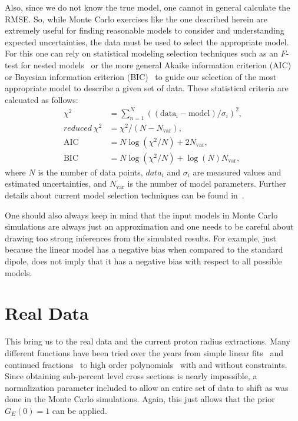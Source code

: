 \documentclass[10pt,aps,prc,twocolumn]{revtex4-1}
\begin{document}
Also, since we do not know the true model, one cannot in general calculate the RMSE. So, while Monte Carlo exercises 
like the one described herein are extremely useful for finding reasonable models to consider and understanding
expected uncertainties, the data must be used to select the appropriate model. 
For this one can rely on statistical modeling selection techniques such as an $F$-test for
nested models~\cite{Bevington:2003,James:2006,Sirca:2016} or the more general Akaike information criterion (AIC)~\cite{Akaike:1974} 
or Bayesian information criterion (BIC)~\cite{Schwarz:1978} 
to guide our selection of the most appropriate model to describe a given set of data.
These statistical criteria are calcuated as follows: 
\begin{align}
\chi^2         & = \sum_{n=1}^{N}((\mathrm{data_i} - \mathrm{model}) / \sigma_i)^2, \\
reduced~\chi^2 & = \chi^2/ (N - N_{\mathrm{var}}),  \\
\mathrm{AIC}            & = N \log(\chi^2/N) + 2 N_{\mathrm{var}}, \\
\mathrm{BIC}            & = N \log(\chi^2/N) + \log(N) N_{\mathrm{var}},
\end{align}
where $N$ is the number of data points, $data_i$ and $\sigma_i$ are measured values and estimated uncertainties,
and $N_{\mathrm{var}}$ is the number of model parameters.
Further details about current model selection techniques can be found in~\cite{Ernst:2012}.

One should also always keep in mind that the input models in Monte Carlo simulations are always just an approximation
and one needs to be careful about drawing too strong inferences from the simulated results. 
For example, just because the linear model has a negative bias when compared to the standard dipole, 
does not imply that it has a negative bias with respect to all possible models.


\section{Real Data}

This bring us to the real data and the current proton radius extractions.   Many different functions have
been tried over the years from simple linear fits~\cite{Hand:1963zz,Murphy:1974zz} and continued fractions~\cite{Sick:2003gm} 
to high order polynomials~\cite{Bernauer:2013tpr,Lee:2015jqa} with and without constraints.   Since obtaining sub-percent
level cross sections is nearly impossible, a normalization parameter included to allow an entire set of data to shift
as was done in the Monte Carlo simulations.   Again, this just allows that the prior $G_E(0)=1$ can be applied.
\end{document}
